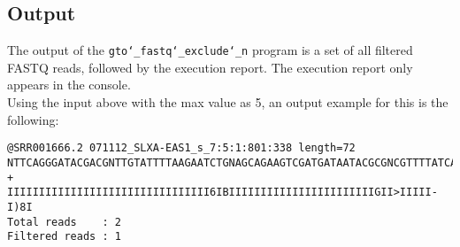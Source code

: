 \subsection*{Output}
The output of the \texttt{gto\char`_fastq\char`_exclude\char`_n} program is a set of all filtered FASTQ reads, followed by the execution report.
The execution report only appears in the console.\\
Using the input above with the max value as 5, an output example for this is the following:
\begin{lstlisting}
@SRR001666.2 071112_SLXA-EAS1_s_7:5:1:801:338 length=72
NTTCAGGGATACGACGNTTGTATTTTAAGAATCTGNAGCAGAAGTCGATGATAATACGCGNCGTTTTATCAN
+
IIIIIIIIIIIIIIIIIIIIIIIIIIIIIIII6IBIIIIIIIIIIIIIIIIIIIIIIIGII>IIIII-I)8I
Total reads    : 2
Filtered reads : 1
\end{lstlisting}
